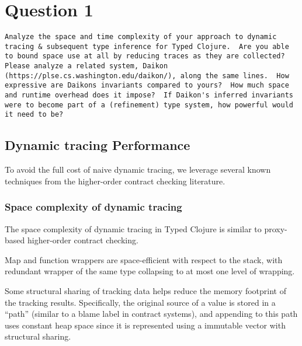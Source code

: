 \section{Question 1}

\begin{verbatim}
Analyze the space and time complexity of your approach to dynamic
tracing & subsequent type inference for Typed Clojure.  Are you able
to bound space use at all by reducing traces as they are collected?
Please analyze a related system, Daikon
(https://plse.cs.washington.edu/daikon/), along the same lines.  How
expressive are Daikons invariants compared to yours?  How much space
and runtime overhead does it impose?  If Daikon's inferred invariants
were to become part of a (refinement) type system, how powerful would
it need to be?
\end{verbatim}

\pagebreak

\subsection{Dynamic tracing Performance}

To avoid the full cost of naive dynamic tracing, we leverage several
known techniques from the higher-order contract checking literature.

\subsubsection{Space complexity of dynamic tracing}

The space complexity of dynamic tracing in Typed Clojure is similar
to proxy-based higher-order contract checking.

Map and function wrappers are space-efficient with respect to the stack, with
redundant wrapper of the same type collapsing to at most one level of wrapping.

Some structural sharing of tracking data helps reduce the memory footprint
of the tracking results. Specifically, the original source of a value
is stored in a ``path'' (similar to a blame label in contract systems),
and appending to this path uses constant heap space since it is represented
using a immutable vector with structural sharing.


%

